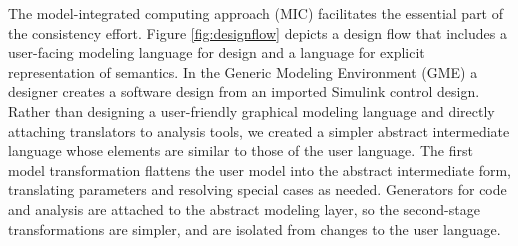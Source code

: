 The model-integrated computing approach (MIC) \cite{mic:overview} facilitates
the essential part of the consistency effort.  Figure \ref{fig:designflow} depicts
a design flow that includes a user-facing modeling language for design and a
language for explicit representation of semantics.  In the Generic Modeling
Environment (GME) \cite{mic:gme} a designer creates a 
software design from an imported Simulink control design.  Rather than designing
a user-friendly graphical modeling language and directly attaching translators
to analysis tools, we created a simpler abstract intermediate language whose
elements are similar to those of the user language. The first model
transformation flattens the user model into the abstract intermediate form,
translating parameters and resolving special cases as needed. Generators for code 
and analysis are attached to the abstract modeling layer, so the second-stage
transformations are simpler, and are isolated from changes to the user language.

